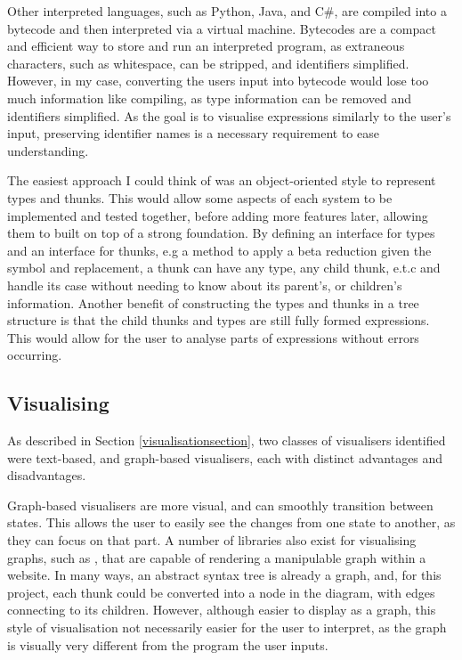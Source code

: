 Other interpreted languages, such as Python, Java, and C\#, are compiled into a bytecode and then interpreted via a virtual machine. Bytecodes are a compact and efficient way to store and run an interpreted program, as extraneous characters, such as whitespace, can be stripped, and identifiers simplified. However, in my case, converting the users input into bytecode would lose too much information like compiling, as type information can be removed and identifiers simplified. As the goal is to visualise expressions similarly to the user's input, preserving identifier names is a necessary requirement to ease understanding.

The easiest approach I could think of was an object-oriented style to represent types and thunks. This would allow some aspects of each system to be implemented and tested together, before adding more features later, allowing them to built on top of a strong foundation. By defining an interface for types and an interface for thunks, e.g a method to apply a beta reduction  given the symbol and replacement, a thunk can have any type, any child thunk, e.t.c and handle its case without needing to know about its parent's, or children's information. Another benefit of constructing the types and thunks in a tree structure is that the child thunks and types are still fully formed expressions. This would allow for the user to analyse parts of expressions without errors occurring.

\subsection{Visualising}
As described in Section \ref{visualisationsection}, two classes of visualisers identified were text-based, and graph-based visualisers, each with distinct advantages and disadvantages.

Graph-based visualisers are more visual, and can smoothly transition between states. This allows the user to easily see the changes from one state to another, as they can focus on that part. A number of libraries also exist for visualising graphs, such as \cite{cytoscape}, that are capable of rendering a manipulable graph within a website. In many ways, an abstract syntax tree is already a graph, and, for this project, each thunk could be converted into a node in the diagram, with edges connecting to its children. However, although easier to display as a graph, this style of visualisation not necessarily easier for the user to interpret, as the graph is visually very different from the program the user inputs.

